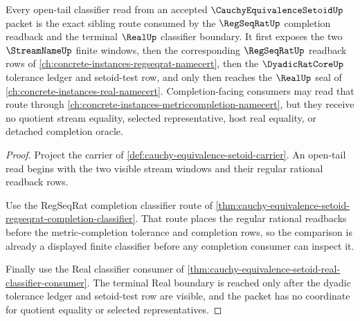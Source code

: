 \begin{theorem}
\label{thm:cauchy-equivalence-setoid-open-tail-classifier}
Every open-tail classifier read from an accepted $\CauchyEquivalenceSetoidUp$ packet is the exact sibling route consumed by the $\RegSeqRatUp$ completion readback and the terminal $\RealUp$ classifier boundary. It first exposes the two $\StreamNameUp$ finite windows, then the corresponding $\RegSeqRatUp$ readback rows of \autoref{ch:concrete-instances-regseqrat-namecert}, then the $\DyadicRatCoreUp$ tolerance ledger and setoid-test row, and only then reaches the $\RealUp$ seal of \autoref{ch:concrete-instances-real-namecert}. Completion-facing consumers may read that route through \autoref{ch:concrete-instances-metriccompletion-namecert}, but they receive no quotient stream equality, selected representative, host real equality, or detached completion oracle.
\end{theorem}
\begin{proof}
Project the carrier of \autoref{def:cauchy-equivalence-setoid-carrier}. An open-tail read begins with the two visible stream windows and their regular rational readback rows.

Use the RegSeqRat completion classifier route of \autoref{thm:cauchy-equivalence-setoid-regseqrat-completion-classifier}. That route places the regular rational readbacks before the metric-completion tolerance and completion rows, so the comparison is already a displayed finite classifier before any completion consumer can inspect it.

Finally use the Real classifier consumer of \autoref{thm:cauchy-equivalence-setoid-real-classifier-consumer}. The terminal Real boundary is reached only after the dyadic tolerance ledger and setoid-test row are visible, and the packet has no coordinate for quotient equality or selected representatives.
\end{proof}
